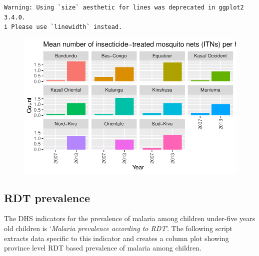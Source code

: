 \documentclass[
  letterpaper,
  DIV=11,
  numbers=noendperiod]{scrreprt}
\begin{document}
\begin{verbatim}
Warning: Using `size` aesthetic for lines was deprecated in ggplot2 3.4.0.
i Please use `linewidth` instead.
\end{verbatim}

\begin{figure}[H]

{\centering \includegraphics{module_02_files/figure-pdf/unnamed-chunk-11-1.pdf}

}

\end{figure}

\hypertarget{rdt-prevalence}{%
\subsection{RDT prevalence}\label{rdt-prevalence}}

The DHS indicators for the prevalence of malaria among children
under-five years old children is `\emph{Malaria prevalence according to
RDT}'. The following script extracts data specific to this indicator and
creates a column plot showing province level RDT based prevalence of
malaria among children.
\end{document}
